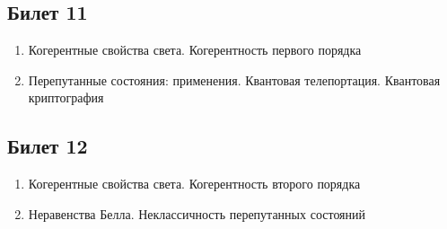 \documentclass[12pt,a4paper]{article}
\begin{document}
\subsection*{Билет 11} 
\begin{enumerate}
\item Когерентные свойства света. Когерентность первого порядка
\item Перепутанные состояния: применения. Квантовая
  телепортация. Квантовая криптография
\end{enumerate}

\subsection*{Билет 12} 
\begin{enumerate}
\item Когерентные свойства света. Когерентность второго порядка
\item Неравенства Белла. Неклассичность перепутанных состояний
\end{enumerate}
\end{document}
